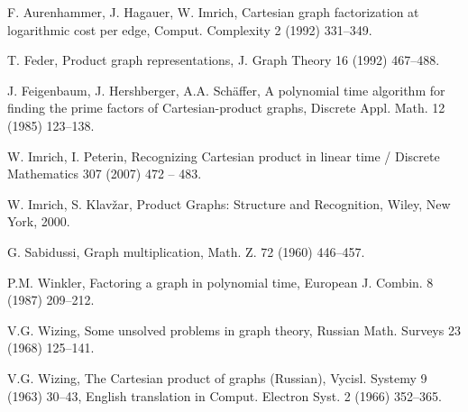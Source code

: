 \documentclass[12pt,a4paper,titlepage]{article}
\begin{document}
\newpage
\begin{thebibliography}{99}
 F. Aurenhammer, J. Hagauer, W. Imrich, 
Cartesian graph factorization at logarithmic cost per edge, Comput. Complexity 2 (1992) 331–349.

 T. Feder, 
Product graph representations, J. Graph Theory 16 (1992) 467–488.

 J. Feigenbaum, J. Hershberger, A.A. Schäffer, 
A polynomial time algorithm for finding the prime factors of Cartesian-product graphs, Discrete Appl. Math. 12 (1985) 123–138.

 W. Imrich, I. Peterin, 
Recognizing Cartesian product in linear time / Discrete Mathematics 307 (2007) 472 – 483.

 W. Imrich, S. Klavžar, 
Product Graphs: Structure and Recognition, Wiley, New York, 2000.

 G. Sabidussi,
Graph multiplication, Math. Z. 72 (1960) 446–457.

 P.M. Winkler, 
Factoring a graph in polynomial time, European J. Combin. 8 (1987) 209–212.

 V.G. Wizing, 
Some unsolved problems in graph theory, Russian Math. Surveys 23 (1968) 125–141.

 V.G. Wizing,
The Cartesian product of graphs (Russian), Vycisl. Systemy 9 (1963) 30–43, English translation in Comput. Electron Syst. 2 (1966) 352–365.
\end{thebibliography}
\end{document}
